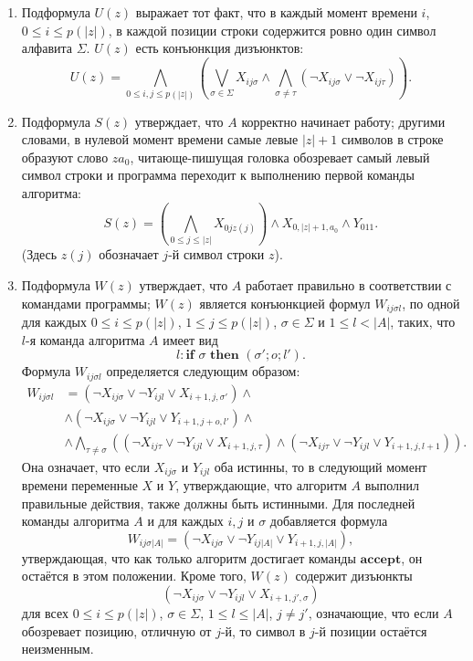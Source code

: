 \documentclass[a4paper,12pt]{article}
\begin{document}
\begin{enumerate}
    \item Подформула \(U(z)\) выражает тот факт, что в каждый момент времени \(i\), \(0 \le i \le p(|z|)\), в каждой позиции строки содержится ровно один символ алфавита \(\Sigma\). \(U(z)\) есть конъюнкция дизъюнктов:
    \[
    U(z) = \bigwedge_{0 \le i, j \le p(|z|)} \left( \bigvee_{\sigma \in \Sigma} X_{ij\sigma} \land \bigwedge_{\sigma \neq \tau} (\neg X_{ij\sigma} \lor \neg X_{ij\tau}) \right).
    \]
    
    \item Подформула \(S(z)\) утверждает, что \(A\) корректно начинает работу; другими словами, в нулевой момент времени самые левые \(|z| + 1\) символов в строке образуют слово \(z a_0\), читающе-пишущая головка обозревает самый левый символ строки и программа переходит к выполнению первой команды алгоритма:
    \[
    S(z) = \left(\bigwedge_{0 \le j \le |z|} X_{0jz(j)}\right) \land X_{0, |z|+1, a_0} \land Y_{011}.
    \]
    (Здесь \(z(j)\) обозначает \(j\)-й символ строки \(z\)).
    
    \item Подформула \(W(z)\) утверждает, что \(A\) работает правильно в соответствии с командами программы; \(W(z)\) является конъюнкцией формул \(W_{ij\sigma l}\), по одной для каждых \(0 \le i \le p(|z|)\), \(1 \le j \le p(|z|)\), \(\sigma \in \Sigma\) и \(1 \le l < |A|\), таких, что \(l\)-я команда алгоритма \(A\) имеет вид
    \[
    l: \textbf{if } \sigma \textbf{ then } (\sigma'; o; l').
    \]
    Формула \(W_{ij\sigma l}\) определяется следующим образом:
    \[
    \begin{aligned}
    W_{ij\sigma l} &= (\neg X_{ij\sigma} \lor \neg Y_{ijl} \lor X_{i+1, j, \sigma'}) \land \\
    &\land (\neg X_{ij\sigma} \lor \neg Y_{ijl} \lor Y_{i+1, j+o, l'}) \land \\
    &\land \bigwedge_{\tau \neq \sigma} ((\neg X_{ij\tau} \lor \neg Y_{ijl} \lor X_{i+1, j, \tau}) \land (\neg X_{ij\tau} \lor \neg Y_{ijl} \lor Y_{i+1, j, l+1})).
    \end{aligned}
    \]
    Она означает, что если \(X_{ij\sigma}\) и \(Y_{ijl}\) оба истинны, то в следующий момент времени переменные \(X\) и \(Y\), утверждающие, что алгоритм \(A\) выполнил правильные действия, также должны быть истинными. Для последней команды алгоритма \(A\) и для каждых \(i, j\) и \(\sigma\) добавляется формула
    \[
    W_{ij\sigma|A|} = (\neg X_{ij\sigma} \lor \neg Y_{ij|A|} \lor Y_{i+1, j, |A|}),
    \]
    утверждающая, что как только алгоритм достигает команды \(\textbf{accept}\), он остаётся в этом положении. Кроме того, \(W(z)\) содержит дизъюнкты
    \[
    (\neg X_{ij\sigma} \lor \neg Y_{ijl} \lor X_{i+1, j', \sigma})
    \]
    для всех \(0 \le i \le p(|z|)\), \(\sigma \in \Sigma\), \(1 \le l \le |A|\), \(j \neq j'\), означающие, что если \(A\) обозревает позицию, отличную от \(j\)-й, то символ в \(j\)-й позиции остаётся неизменным.
    

\end{enumerate}
\end{document}
